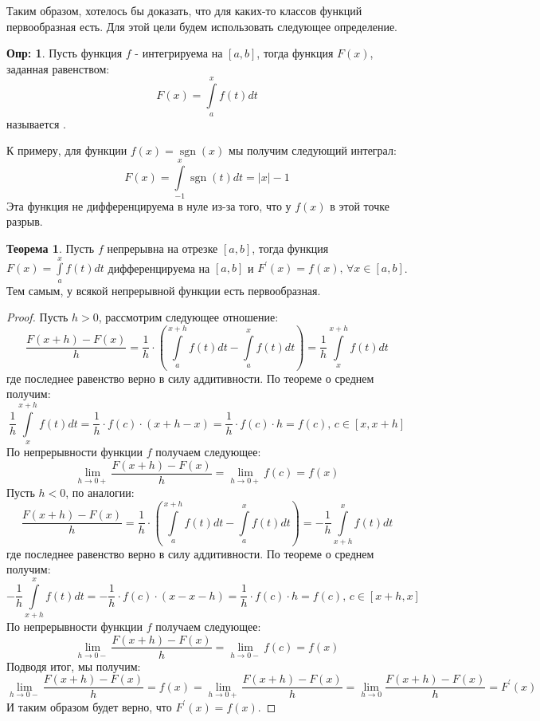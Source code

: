 \documentclass[12pt]{article}
\theoremstyle{definition}
\newtheorem{defn}{Опр:}
\newtheorem{theorem}{Теорема}
\DeclareMathOperator{\sgn}{sgn}
\newcommand{\ddint}[2]{\displaystyle\int\limits_{#1}^{#2}}
\begin{document}
Таким образом, хотелось бы доказать, что для каких-то классов функций первообразная есть. Для этой цели будем использовать следующее определение.
\begin{defn}
	Пусть функция $f$ - интегрируема на $[a,b]$, тогда функция $F(x)$, заданная равенством:
	$$
		F(x) = \ddint{a}{x}f(t)dt
	$$
	называется .
\end{defn}

К примеру, для функции $f(x) = \sgn(x)$ мы получим следующий интеграл:
$$
	F(x) = \ddint{-1}{x}\sgn(t)dt = |x| - 1
$$
Эта функция не дифференцируема в нуле из-за того, что у $f(x)$ в этой точке разрыв.

\begin{theorem}
	Пусть $f$ непрерывна на отрезке $[a,b]$, тогда функция $F(x) = \ddint{a}{x}f(t)dt$ дифференцируема на $[a,b]$ и $F^\prime(x) = f(x), \, \forall x \in [a,b]$. Тем самым, у всякой непрерывной функции есть первообразная.
\end{theorem}
\begin{proof}
	Пусть $h > 0$, рассмотрим следующее отношение:
	$$
		\dfrac{F(x + h) - F(x)}{h} = \dfrac{1}{h}{\cdot}\!\!\left(\ddint{a}{x + h} f(t)dt - \ddint{a}{x}f(t)dt\right) = \dfrac{1}{h}\ddint{x}{x + h} f(t)dt 
	$$
	где последнее равенство верно в силу аддитивности. По теореме о среднем получим:
	$$
		\dfrac{1}{h}\ddint{x}{x + h} f(t)dt  = \dfrac{1}{h}{\cdot}f(c){\cdot}(x + h - x) = \dfrac{1}{h}{\cdot}f(c){\cdot}h = f(c), \, c \in [x, x + h]
	$$
	По непрерывности функции $f$ получаем следующее:
	$$
		\lim\limits_{h \to 0+} \dfrac{F(x + h) - F(x)}{h} = 	\lim\limits_{h \to 0+}f(c) = f(x)
	$$
	Пусть $h < 0$, по аналогии:
	$$
		\dfrac{F(x + h) - F(x)}{h} = \dfrac{1}{h}{\cdot}\!\!\left(\ddint{a}{x + h} f(t)dt - \ddint{a}{x}f(t)dt\right) = -\dfrac{1}{h}\ddint{x + h}{x} f(t)dt 
	$$
	где последнее равенство верно в силу аддитивности. По теореме о среднем получим:
	$$
		-\dfrac{1}{h}\ddint{x + h}{x} f(t)dt  = -\dfrac{1}{h}{\cdot}f(c){\cdot}(x - x - h) = \dfrac{1}{h}{\cdot}f(c){\cdot}h = f(c), \, c \in [x + h, x]
	$$
	По непрерывности функции $f$ получаем следующее:
	$$
		\lim\limits_{h \to 0-} \dfrac{F(x + h) - F(x)}{h} = 	\lim\limits_{h \to 0-}f(c) = f(x)
	$$
	Подводя итог, мы получим:
	$$
		\lim\limits_{h \to 0-} \dfrac{F(x + h) - F(x)}{h} = f(x) = \lim\limits_{h \to 0+} \dfrac{F(x + h) - F(x)}{h} = \lim\limits_{h \to 0} \dfrac{F(x + h) - F(x)}{h} = F^\prime(x)
	$$
	И таким образом будет верно, что $F^\prime(x) = f(x)$.
\end{proof}
\end{document}
